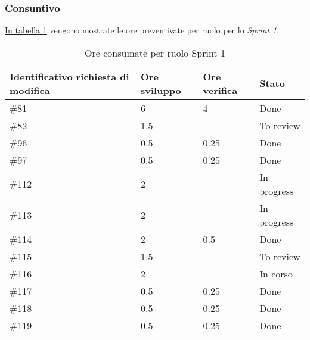 \subsubsection{Consuntivo}

\hyperref[tab:sprint1_ore_consumate]{In tabella \ref{tab:sprint1_ore_consumate}} vengono mostrate le ore preventivate per ruolo per lo \textit{Sprint 1}.

\begin{table}[!h]
    \centering
        \begin{tabular}{| l | l | l | l |}
            \hline
                \textbf{Identificativo richiesta di modifica} & 
                \textbf{Ore sviluppo} &
                \textbf{Ore verifica} & 
                \textbf{Stato}\\ 
    \hline
        \#81 & 6 & 4 & Done\\
    \hline
        \#82 & 1.5 &  & To review\\
    \hline
        \#96 & 0.5 & 0.25 & Done\\
    \hline
        \#97 & 0.5 & 0.25 & Done\\
    \hline
        \#112 & 2 & & In progress\\
    \hline
        \#113 & 2 & & In progress\\
    \hline
        \#114 & 2 & 0.5 & Done\\
    \hline
        \#115 & 1.5 & & To review\\
    \hline
        \#116 & 2 & & In corso\\
    \hline
        \#117 & 0.5 & 0.25 & Done\\
    \hline
        \#118 & 0.5 & 0.25 & Done\\
    \hline
        \#119 & 0.5 & 0.25 & Done\\
    \hline
    \end{tabular}
    \caption{Ore consumate per ruolo Sprint 1}
    \label{tab:sprint1_ore_consumate} 
\end{table}